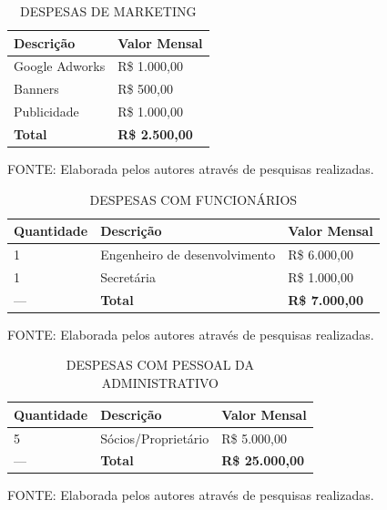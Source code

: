 \documentclass[
	12pt,				%
	openright,			%
	oneside,			%
	a4paper,			%
	english,			%
	french,				%
	spanish,			%
	brazil				%
	]{abntex2}
\begin{document}
	\begin{table} [th]
	\caption{DESPESAS DE MARKETING}
	\centering
	\begin{tabular}{p{6cm}|p{6cm}}

		\textbf{Descrição} & \textbf{Valor Mensal}\\
		\hline
		Google Adworks & R\$ 1.000,00 \\
		Banners & R\$ 500,00 \\
		Publicidade & R\$ 1.000,00 \\
		\hline
		\textbf{Total} & \textbf{R\$ 2.500,00}			
	\end{tabular}
	
	\begin{small}
		FONTE: Elaborada pelos autores através de pesquisas realizadas.
	\end{small}	
	\end{table}	
	
	\begin{table} [th]
	\caption{DESPESAS COM FUNCIONÁRIOS}
	\centering
	\begin{tabular}{p{2.3cm}|p{6cm}|p{4cm}}

		\textbf{Quantidade} & \textbf{Descrição} & \textbf{Valor Mensal}\\
		\hline
		1 & Engenheiro de desenvolvimento & R\$ 6.000,00 \\
		1 & Secretária & R\$ 1.000,00 \\
		\hline
		--- & \textbf{Total} & \textbf{R\$ 7.000,00}			
	\end{tabular}
	
	\begin{small}
		FONTE: Elaborada pelos autores através de pesquisas realizadas.
	\end{small}	
	\end{table}\pagebreak
	
	\begin{table} [th]
	\caption{DESPESAS COM PESSOAL DA ADMINISTRATIVO}
	\centering
	\begin{tabular}{p{2.3cm}|p{6cm}|p{4cm}}

		\textbf{Quantidade} & \textbf{Descrição} & \textbf{Valor Mensal}\\
		\hline
		5 & Sócios/Proprietário & R\$ 5.000,00 \\
		\hline
		--- & \textbf{Total} & \textbf{R\$ 25.000,00}	
	
	\end{tabular}
	
	\begin{small}
		FONTE: Elaborada pelos autores através de pesquisas realizadas.
	\end{small}	
	\end{table}
	
\end{document}
